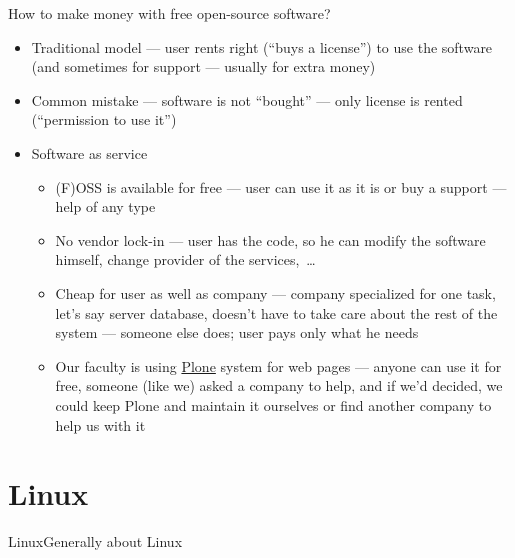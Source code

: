 \documentclass[compress, ucs, xelatex, 11pt, xcolor=svgnames,
  hyperref={
    bookmarks=true,
    unicode=true,
    colorlinks=true,
    pdftitle={Linux, command line and MetaCentrum},
    plainpages=false,
    pdfauthor={Vojtech Zeisek},
    pdfsubject={Course about use of Linux command line, writing shell scripts and using MetaCentrum of CESNET},
    pdfcreator={XeLaTeX},
    pdfkeywords={Linux, GNU, BASH, shell, command line, MetaCentrum},
    linkcolor=DarkRed,
    anchorcolor=DarkBlue,
    citecolor=Indigo,
    filecolor=NavyBlue,
    menucolor=DarkMagenta,
    urlcolor=DarkBlue,
    pdftex},
  url={hyphens, lowtilde} %
  ]{beamer}
\begin{document}
\begin{frame}{How to make money with free open-source software?}
  \begin{itemize}
    \item Traditional model --- user rents right (``buys a license'') to use the software (and sometimes for support --- usually for extra money)
    \item Common mistake --- software is not ``bought'' --- only license is rented (``permission to use it'')
    \item Software as service
    \begin{itemize}
      \item (F)OSS is available for free --- user can use it as it is or buy a support --- help of any type
      \item No vendor lock-in --- user has the code, so he can modify the software himself, change provider of the services,~\ldots
      \item Cheap for user as well as company --- company specialized for one task, let's say server database, doesn't have to take care about the rest of the system --- someone else does; user pays only what he needs
      \item Our faculty is using \href{https://plone.org/}{Plone} system for web pages --- anyone can use it for free, someone (like we) asked a company to help, and if we'd decided, we  could keep Plone and maintain it ourselves or find another company to help us with it
    \end{itemize}
  \end{itemize}
\end{frame}

\section{Linux}

\begin{frame}{Linux}{Generally about Linux}
  \tableofcontents[currentsection, sectionstyle=show/hide, hideothersubsections]
\end{frame}
\end{document}
